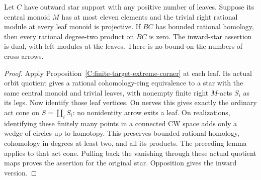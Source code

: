 \begin{corollary}\label{C:small-center-projective-leaves-starlimit}
Let $C$ have outward star support with any positive number
of leaves. Suppose its central monoid $M$ has at most eleven
elements and the trivial right rational module at every leaf
monoid is projective. If $BC$ has bounded rational homology,
then every rational degree-two product on $BC$ is zero.
The inward-star assertion is dual, with left modules at the leaves.
There is no bound on the numbers of cross arrows.
\end{corollary}
\begin{proof}
Apply Proposition~\ref{C:finite-target-extreme-corner} at each
leaf. Its actual orbit quotient gives a rational cohomology-ring
equivalence to a star with the same central monoid and trivial
leaves, with nonempty finite right $M$-acts $S_i$ as its legs.
Now identify those leaf vertices. On nerves this gives exactly
the ordinary act cone on $S=\coprod_i S_i$: no nonidentity
arrow exits a leaf. On realizations, identifying these finitely
many points in a connected CW space adds only a wedge of
circles up to homotopy. This preserves bounded rational
homology, cohomology in degrees at least two, and all its
products. The preceding lemma applies to that act cone.
Pulling back the vanishing through these actual quotient maps
proves the assertion for the original star. Opposition gives
the inward version.
\end{proof}
